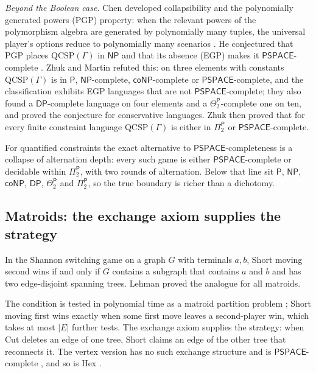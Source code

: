\documentclass[final]{siamart0516}
\numberwithin{theorem}{section}
\numberwithin{equation}{section}
\theoremstyle{siamnonum}
\renewenvironment{remark*}{\remarkstar}{\endremarkstar}
\theoremstyle{plain}
\newcommand{\cls}[1]{\mathsf{#1}}
\newcommand{\PSPACE}{\cls{PSPACE}}
\newcommand{\NP}{\cls{NP}}
\newcommand{\coNP}{\cls{coNP}}
\newcommand{\Pclass}{\cls{P}}
\begin{document}
\noindent\emph{Beyond the Boolean case.} Chen developed collapsibility and the polynomially generated powers (PGP) property: when the relevant powers of the polymorphism algebra are generated by polynomially many tuples, the universal player's options reduce to polynomially many scenarios \cite{Chen08,Chen11}. He conjectured that PGP places $\mathrm{QCSP}(\Gamma)$ in $\NP$ and that its absence (EGP) makes it $\PSPACE$-complete \cite{Chen12}. Zhuk and Martin \cite{ZhukMartin} refuted this: on three elements with constants $\mathrm{QCSP}(\Gamma)$ is in $\Pclass$, $\NP$-complete, $\coNP$-complete or $\PSPACE$-complete, and the classification exhibits EGP languages that are not $\PSPACE$-complete; they also found a $\mathsf{DP}$-complete language on four elements and a $\Theta_2^{\Pclass}$-complete one on ten, and proved the conjecture for conservative languages. Zhuk \cite{Zhuk24} then proved that for every finite constraint language $\mathrm{QCSP}(\Gamma)$ is either in $\Pi_2^{\Pclass}$ or $\PSPACE$-complete.

\begin{remark*}
For quantified constraints the exact alternative to $\PSPACE$-completeness is a collapse of alternation depth: every such game is either $\PSPACE$-complete or decidable within $\Pi_2^{\Pclass}$, with two rounds of alternation. Below that line sit $\Pclass$, $\NP$, $\coNP$, $\mathsf{DP}$, $\Theta_2^{\Pclass}$ and $\Pi_2^{\Pclass}$, so the true boundary is richer than a dichotomy.
\end{remark*}

\subsection{Matroids: the exchange axiom supplies the strategy}\label{ssec:matroid}
\begin{theorem}\label{thm:lehman}
In the Shannon switching game on a graph $G$ with terminals $a,b$, Short moving second wins if and only if $G$ contains a subgraph that contains $a$ and $b$ and has two edge-disjoint spanning trees. Lehman proved the analogue for all matroids.
\end{theorem}
The condition is tested in polynomial time as a matroid partition problem \cite{EdmondsPartition}; Short moving first wins exactly when some first move leaves a second-player win, which takes at most $|E|$ further tests. The exchange axiom supplies the strategy: when Cut deletes an edge of one tree, Short claims an edge of the other tree that reconnects it. The vertex version has no such exchange structure and is $\PSPACE$-complete \cite{EvenTarjan}, and so is Hex \cite{Reisch}.
\end{document}
